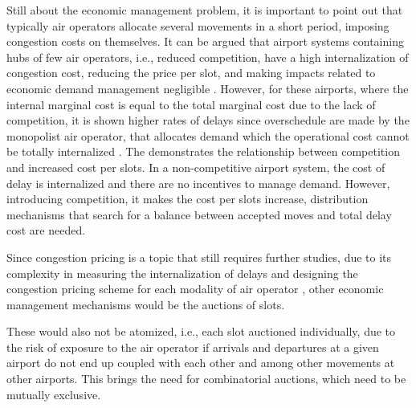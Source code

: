 Still about the economic management problem, it is important to point out that
typically air operators allocate several movements in a short period, imposing
congestion costs on themselves.
%
It can be argued that airport systems containing hubs of few air operators,
i.e., reduced competition, have a high internalization of congestion cost,
reducing the price per slot, and making impacts related to economic demand
management negligible \cite{ball2006auctions, gillen2016airport}.
%
However, for these airports, where the internal marginal cost is equal to the
total marginal cost due to the lack of competition, it is shown higher rates of
delays since overschedule are made by the monopolist air operator, that
allocates demand which the operational cost cannot be totally internalized
\cite{ball2006auctions}.
%
The  demonstrates the relationship between competition
and increased cost per slots.
%
In a non-competitive airport system, the cost of delay is internalized and there
are no incentives to manage demand.
%
However, introducing competition, it makes the cost per slots increase,
distribution mechanisms that search for a balance between accepted moves and
total delay cost are needed.



%



Since congestion pricing is a topic that still requires further studies, due to
its complexity in measuring the internalization of delays and designing the
congestion pricing scheme for each modality of air operator
\cite{gillen2016airport}, other economic management mechanisms would be the
auctions of slots.
%



These would also not be atomized, i.e., each slot auctioned individually, due to
the risk of exposure to the air operator if arrivals and departures at a given
airport do not end up coupled with each other and among other movements at other
airports.
%
This brings the need for combinatorial auctions, which need to be mutually
exclusive.






